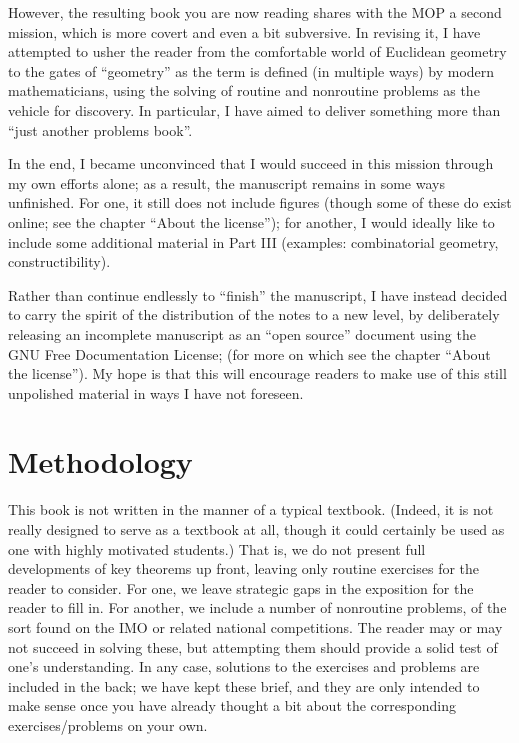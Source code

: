 \documentclass[12pt]{book}
\numberwithin{exc}{section}
\numberwithin{figure}{section}
\numberwithin{equation}{theorem}
\begin{document}
However, the resulting book you are now reading shares with the MOP
a second mission, which is more covert and even a bit subversive.
In revising it, I have attempted to
usher the reader from the comfortable world
of Euclidean geometry to the gates of ``geometry'' as the term is defined
(in multiple ways)
by modern mathematicians, using the solving of routine and nonroutine
problems as the vehicle for discovery. In particular, I have aimed to
deliver something more than ``just another problems book''.

In the end, I became unconvinced that I would succeed in this mission
through my own efforts alone; as a result, the manuscript remains in some
ways unfinished. For one, it still does not include figures (though
some of these do exist online; see the chapter ``About the license'');
for another,
I would ideally like to include some additional material in Part III
(examples: combinatorial geometry, constructibility).

Rather than continue endlessly to ``finish'' the manuscript,
I have instead decided to carry the spirit of the distribution of the
notes to a new level, by deliberately releasing an incomplete manuscript
as an ``open source'' document using the
GNU Free Documentation License; 
 (for more on which see the 
chapter ``About the license'').
My hope is that this will encourage readers to make use of this still
unpolished material
in ways I have not foreseen.

\section{Methodology}

This book is not written in the manner of a typical textbook.
(Indeed, it is not really designed to serve as a textbook at all,
though it could certainly be used as one with highly motivated students.)
That is, we do not
present full developments of key theorems up front, leaving
only routine exercises for the reader to consider. For one, we leave
strategic gaps in the exposition for the reader to fill in. For another,
we include a number of nonroutine problems, of the sort found on the
IMO or related national competitions. The reader may or may not succeed
in solving these, but attempting them should provide a solid test of
one's understanding. In any case, solutions to the exercises
and problems are included in the back; we have kept these brief, and they
are only intended to make sense once you have already thought a bit about the
corresponding exercises/problems on your own.
\end{document}
